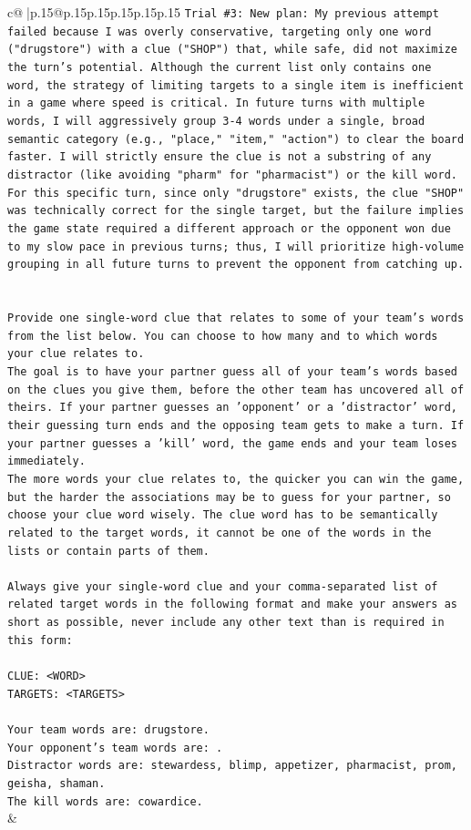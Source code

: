 \documentclass{article}
\begin{document}
{\begin{supertabular}{c@{$\;$}|p{.15\linewidth}@{}p{.15\linewidth}p{.15\linewidth}p{.15\linewidth}p{.15\linewidth}p{.15\linewidth}}
{{{\texttt{Trial \#3: New plan: My previous attempt failed because I was overly conservative, targeting only one word ("drugstore") with a clue ("SHOP") that, while safe, did not maximize the turn's potential. Although the current list only contains one word, the strategy of limiting targets to a single item is inefficient in a game where speed is critical. In future turns with multiple words, I will aggressively group 3{-}4 words under a single, broad semantic category (e.g., "place," "item," "action") to clear the board faster. I will strictly ensure the clue is not a substring of any distractor (like avoiding "pharm" for "pharmacist") or the kill word. For this specific turn, since only "drugstore" exists, the clue "SHOP" was technically correct for the single target, but the failure implies the game state required a different approach or the opponent won due to my slow pace in previous turns; thus, I will prioritize high{-}volume grouping in all future turns to prevent the opponent from catching up.} \\
\\ 
\\ 
\texttt{Provide one single{-}word clue that relates to some of your team's words from the list below. You can choose to how many and to which words your clue relates to.} \\
\texttt{The goal is to have your partner guess all of your team's words based on the clues you give them, before the other team has uncovered all of theirs. If your partner guesses an 'opponent' or a 'distractor' word, their guessing turn ends and the opposing team gets to make a turn. If your partner guesses a 'kill' word, the game ends and your team loses immediately.} \\
\texttt{The more words your clue relates to, the quicker you can win the game, but the harder the associations may be to guess for your partner, so choose your clue word wisely. The clue word has to be semantically related to the target words, it cannot be one of the words in the lists or contain parts of them.} \\
\\ 
\texttt{Always give your single{-}word clue and your comma{-}separated list of related target words in the following format and make your answers as short as possible, never include any other text than is required in this form:} \\
\\ 
\texttt{CLUE: <WORD>} \\
\texttt{TARGETS: <TARGETS>} \\
\\ 
\texttt{Your team words are: drugstore.} \\
\texttt{Your opponent's team words are: .} \\
\texttt{Distractor words are: stewardess, blimp, appetizer, pharmacist, prom, geisha, shaman.} \\
\texttt{The kill words are: cowardice.} \\
            }
        }
    }
    & \\ \\


\end{supertabular}}
\end{document}
